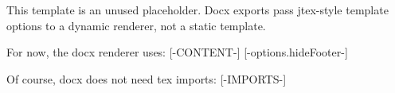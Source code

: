 This template is an unused placeholder. Docx exports pass jtex-style template options to a dynamic renderer, not a static template.

For now, the docx renderer uses:
[-CONTENT-]
[-options.hideFooter-]

Of course, docx does not need tex imports:
[-IMPORTS-]